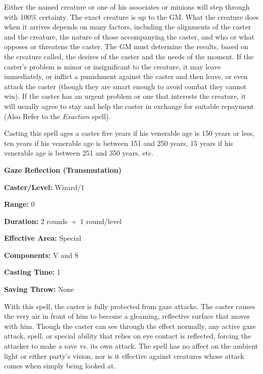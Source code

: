\begin{multicols}{2}
Either the named creature or one of his associates or minions will step through with 100\% certainty.  The exact creature is up to the GM.  What the creature does when it arrives depends on many factors, including the alignments of the caster and the creature, the nature of those accompanying the caster, and who or what opposes or threatens the caster.  The GM must determine the results, based on the creature called, the desires of the caster and the needs of the moment.  If the caster's problem is minor or insignificant to the creature, it may leave immediately, or inflict a punishment against the caster and then leave, or even attack the caster (though they are smart enough to avoid combat they cannot win).  If the caster has an urgent problem or one that interests the creature, it will usually agree to stay and help the caster in exchange for suitable repayment (Also Refer to the \textit{Exaction} spell).  

Casting this spell ages a caster five years if his venerable age is 150 years or less, ten years if his venerable age is between 151 and 250 years, 15 years if his venerable age is between 251 and 350 years, etc.

\vspace{1em}

\noindent
\begin{minipage}{\columnwidth}

\noindent \textbf{Gaze Reflection (Transmutation)}

\noindent \textbf{Caster/Level:} Wizard/1

\noindent \textbf{Range:} 0

\noindent \textbf{Duration:} 2 rounds~+~1 round/level

\noindent \textbf{Effective Area:} Special

\noindent \textbf{Components:} V and S

\noindent \textbf{Casting Time:} 1

\noindent \textbf{Saving Throw:} None

\end{minipage}

With this spell, the caster is fully protected from gaze attacks.  The caster causes the very air in front of him to become a gleaming, reflective surface that moves with him.  Though the caster can see through the effect normally, any active gaze attack, spell, or special ability that relies on eye contact is reflected, forcing the attacker to make a save vs. its own attack.  The spell has no affect on the ambient light or either party's vision, nor is it effective against creatures whose attack comes when simply being looked at.  


\end{multicols}
